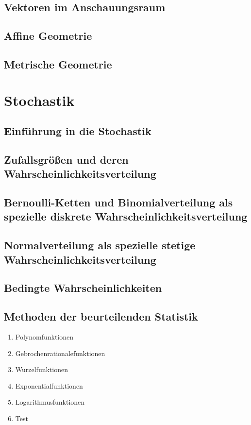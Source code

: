 \documentclass{article}
\begin{document}
\subsection{Vektoren im Anschauungsraum}
\subsection{Affine Geometrie}
\subsection{Metrische Geometrie}

\section{Stochastik}
\subsection{Einführung in die Stochastik}
\subsection{Zufallsgrößen und deren Wahrscheinlichkeitsverteilung}
\subsection{Bernoulli-Ketten und Binomialverteilung als spezielle diskrete Wahrscheinlichkeitsverteilung}
\subsection{Normalverteilung als spezielle stetige Wahrscheinlichkeitsverteilung}
\subsection{Bedingte Wahrscheinlichkeiten}
\subsection{Methoden der beurteilenden Statistik}


\begin{enumerate}
    \item Polynomfunktionen
    \item Gebrochenrationalefunktionen
    \item Wurzelfunktionen
    \item Exponentialfunktionen
    \item Logarithmusfunktionen
    \item Test
\end{enumerate}
\end{document}
